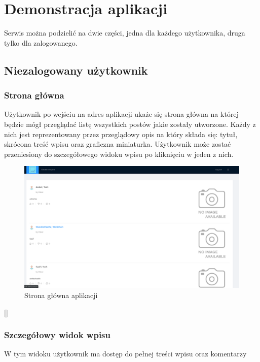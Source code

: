 \documentclass[declaration,shortabstract]{iithesis}
\begin{document}
\section{Demonstracja aplikacji}
Serwis można podzielić na dwie części, jedna dla każdego użytkownika, druga tylko dla zalogowanego.

\subsection{Niezalogowany użytkownik}
\subsubsection{Strona główna}
Użytkownik po wejściu na adres aplikacji ukaże się strona główna na której będzie mógł przeglądać listę wszystkich postów jakie zostały utworzone. Każdy z nich jest reprezentowany przez przeglądowy opis na który składa się: tytuł, skrócona treść wpisu oraz graficzna miniaturka. Użytkownik może zostać przeniesiony do szczegółowego widoku wpisu po kliknięciu w jeden z nich. 
\begin{figure}
    \centering
    \includegraphics[width=\textwidth]{images/stronaglowna.png}
    \caption{Strona główna aplikacji}
    \label{fig:my_label}
\end{figure}[]

\subsubsection{Szczegółowy widok wpisu}
W tym widoku użytkownik ma dostęp do pełnej treści wpisu oraz komentarzy
\end{document}
